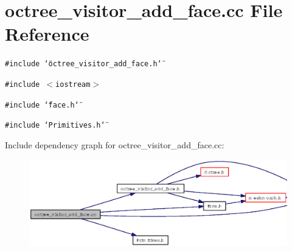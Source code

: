 \section{octree\_\-visitor\_\-add\_\-face.cc File Reference}
\label{octree__visitor__add__face_8cc}
{\tt \#include \char`\"{}octree\_\-visitor\_\-add\_\-face.h\char`\"{}}\par
{\tt \#include $<$iostream$>$}\par
{\tt \#include \char`\"{}face.h\char`\"{}}\par
{\tt \#include \char`\"{}Primitives.h\char`\"{}}\par


Include dependency graph for octree\_\-visitor\_\-add\_\-face.cc:\begin{figure}[H]
\begin{center}
\leavevmode
\includegraphics[width=347pt]{octree__visitor__add__face_8cc__incl}
\end{center}
\end{figure}
